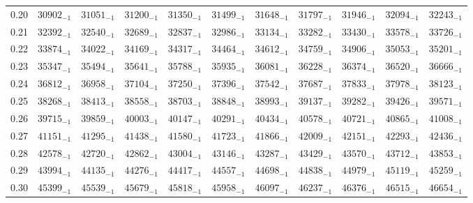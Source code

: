 \documentclass[10pt, a4paper]{article}
\begin{document}
\begin{center}
\begin{longtable}{c || c c c c c | c c c c c}
        \hline
        0.20 & \({30902}_{-1}\) & \({31051}_{-1}\) & \({31200}_{-1}\) & \({31350}_{-1}\) & \({31499}_{-1}\) & \({31648}_{-1}\) & \({31797}_{-1}\) & \({31946}_{-1}\) & \({32094}_{-1}\) & \({32243}_{-1}\)\\
        0.21 & \({32392}_{-1}\) & \({32540}_{-1}\) & \({32689}_{-1}\) & \({32837}_{-1}\) & \({32986}_{-1}\) & \({33134}_{-1}\) & \({33282}_{-1}\) & \({33430}_{-1}\) & \({33578}_{-1}\) & \({33726}_{-1}\)\\
        0.22 & \({33874}_{-1}\) & \({34022}_{-1}\) & \({34169}_{-1}\) & \({34317}_{-1}\) & \({34464}_{-1}\) & \({34612}_{-1}\) & \({34759}_{-1}\) & \({34906}_{-1}\) & \({35053}_{-1}\) & \({35201}_{-1}\)\\
        0.23 & \({35347}_{-1}\) & \({35494}_{-1}\) & \({35641}_{-1}\) & \({35788}_{-1}\) & \({35935}_{-1}\) & \({36081}_{-1}\) & \({36228}_{-1}\) & \({36374}_{-1}\) & \({36520}_{-1}\) & \({36666}_{-1}\)\\
        0.24 & \({36812}_{-1}\) & \({36958}_{-1}\) & \({37104}_{-1}\) & \({37250}_{-1}\) & \({37396}_{-1}\) & \({37542}_{-1}\) & \({37687}_{-1}\) & \({37833}_{-1}\) & \({37978}_{-1}\) & \({38123}_{-1}\)\\
        0.25 & \({38268}_{-1}\) & \({38413}_{-1}\) & \({38558}_{-1}\) & \({38703}_{-1}\) & \({38848}_{-1}\) & \({38993}_{-1}\) & \({39137}_{-1}\) & \({39282}_{-1}\) & \({39426}_{-1}\) & \({39571}_{-1}\)\\
        0.26 & \({39715}_{-1}\) & \({39859}_{-1}\) & \({40003}_{-1}\) & \({40147}_{-1}\) & \({40291}_{-1}\) & \({40434}_{-1}\) & \({40578}_{-1}\) & \({40721}_{-1}\) & \({40865}_{-1}\) & \({41008}_{-1}\)\\
        0.27 & \({41151}_{-1}\) & \({41295}_{-1}\) & \({41438}_{-1}\) & \({41580}_{-1}\) & \({41723}_{-1}\) & \({41866}_{-1}\) & \({42009}_{-1}\) & \({42151}_{-1}\) & \({42293}_{-1}\) & \({42436}_{-1}\)\\
        0.28 & \({42578}_{-1}\) & \({42720}_{-1}\) & \({42862}_{-1}\) & \({43004}_{-1}\) & \({43146}_{-1}\) & \({43287}_{-1}\) & \({43429}_{-1}\) & \({43570}_{-1}\) & \({43712}_{-1}\) & \({43853}_{-1}\)\\
        0.29 & \({43994}_{-1}\) & \({44135}_{-1}\) & \({44276}_{-1}\) & \({44417}_{-1}\) & \({44557}_{-1}\) & \({44698}_{-1}\) & \({44838}_{-1}\) & \({44979}_{-1}\) & \({45119}_{-1}\) & \({45259}_{-1}\)\\
        \hline
        0.30 & \({45399}_{-1}\) & \({45539}_{-1}\) & \({45679}_{-1}\) & \({45818}_{-1}\) & \({45958}_{-1}\) & \({46097}_{-1}\) & \({46237}_{-1}\) & \({46376}_{-1}\) & \({46515}_{-1}\) & \({46654}_{-1}\)\\

\end{longtable}
\end{center}
\end{document}
